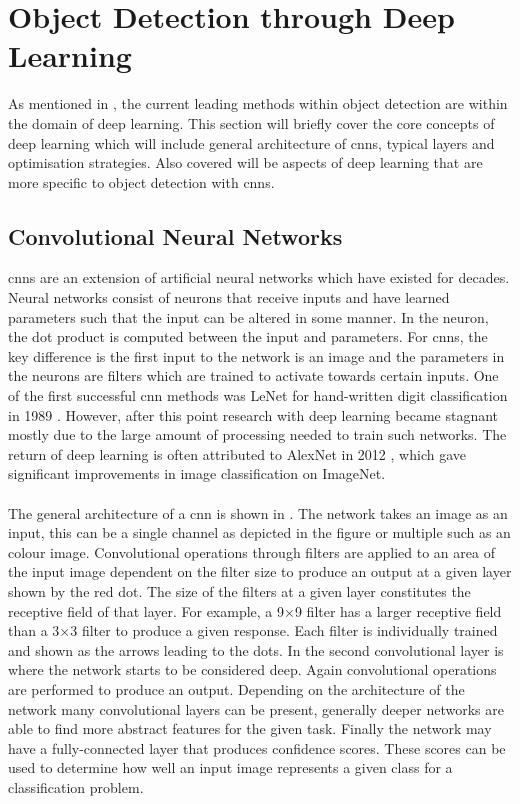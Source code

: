 \section{Object Detection through Deep Learning}
As mentioned in , the current leading methods within object detection are within the domain of deep learning. This section will briefly cover the core concepts of deep learning which will include general architecture of \glspl{cnn}, typical layers and optimisation strategies. Also covered will be aspects of deep learning that are more specific to object detection with \glspl{cnn}.

\subsection{Convolutional Neural Networks}
\glspl{cnn} are an extension of artificial neural networks which have existed for decades. Neural networks consist of neurons that receive inputs and have learned parameters such that the input can be altered in some manner. In the neuron, the dot product is computed between the input and parameters. For \glspl{cnn}, the key difference is the first input to the network is an image and the parameters in the neurons are filters which are trained to activate towards certain inputs. One of the first successful \gls{cnn} methods was LeNet for hand-written digit classification in 1989 \cite{lenet}. However, after this point research with deep learning became stagnant mostly due to the large amount of processing needed to train such networks. The return of deep learning is often attributed to AlexNet in 2012 \cite{alexnet}, which gave significant improvements in image classification on ImageNet.
\\\\
The general architecture of a \gls{cnn} is shown in . The network takes an image as an input, this can be a single channel as depicted in the figure or multiple such as an colour image. Convolutional operations through filters are applied to an area of the input image dependent on the filter size to produce an output at a given layer shown by the red dot. The size of the filters at a given layer constitutes the receptive field of that layer. For example, a 9$\times$9 filter has a larger receptive field than a 3$\times$3 filter to produce a given response. Each filter is individually trained and shown as the arrows leading to the dots. In the second convolutional layer is where the network starts to be considered deep. Again convolutional operations are performed to produce an output. Depending on the architecture of the network many convolutional layers can be present, generally deeper networks are able to find more abstract features for the given task. Finally the network may have a fully-connected layer that produces confidence scores. These scores can be used to determine how well an input image represents a given class for a classification problem.

